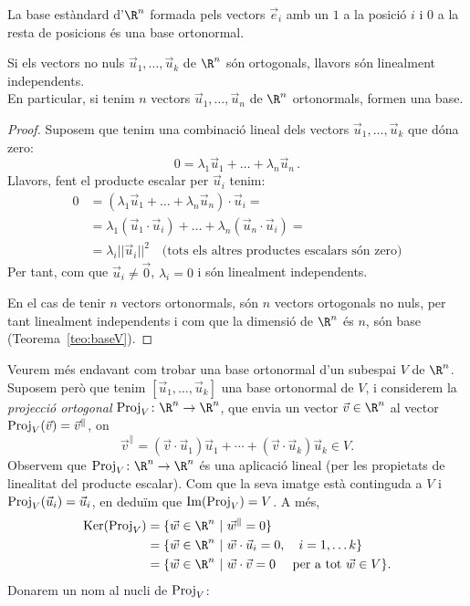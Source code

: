 \begin{exemple}
La base estàndard d'$\R^n$ formada pels vectors $\vec e_i$ amb un $1$ a la posició $i$ i $0$ a la resta de posicions és una base ortonormal.
\end{exemple}
\begin{lema}
Si els vectors no nuls $\vec u_1, \dots, \vec u_k$ de $\R^n$ són ortogonals, llavors són linealment independents.\\
En particular, si tenim $n$ vectors $\vec u_1, \dots, \vec u_n$ de $\R^n$ ortonormals, formen una base.
\end{lema}
\begin{proof}
Suposem que tenim una combinació lineal dels vectors $\vec u_1, \dots, \vec u_k$ que dóna zero:
$$
0 = \lambda_1 \vec u_1 + \dots + \lambda_n\vec u_n \,.
$$
Llavors, fent el producte escalar per $\vec u_i$ tenim:
\begin{align*}
    0 &  = (\lambda_1 \vec u_1 + \dots + \lambda_n\vec u_n)\cdot \vec u_i= \\
     & = \lambda_1 (\vec u_1 \cdot \vec u_i) + \dots + \lambda_n(\vec u_n\cdot \vec u_i)=\\
     & = \lambda_i ||\vec u_i||^2\quad \text{(tots els altres productes escalars són zero)}
\end{align*}
Per tant, com que $\vec u_i\neq\vec 0$, $\lambda_i=0$ i són linealment independents.

En el cas de tenir $n$ vectors ortonormals, són $n$ vectors ortogonals no nuls, per tant linealment independents i com que la dimensió de $\R^n$ és $n$, són base (Teorema~\ref{teo:baseV}).
\end{proof}


Veurem més endavant com trobar una base ortonormal d'un subespai $V$ de $\R^n$. Suposem però que tenim $[\vec u_1,\ldots,\vec u_k]$ una base ortonormal de $V$, i considerem la \emph{projecció ortogonal} $\proj_V\colon \R^n\rightarrow \R^n$, que envia un vector $\vec v\in \R^n$ al vector $\operatorname{Proj}_V(\vec v) = \vec v^\parallel$, on
\[
\vec v^\parallel = (\vec v\cdot \vec u_1)\vec u_1 + \cdots + (\vec v\cdot \vec u_k)\vec u_k \in V.
\]
Observem que $\proj_V\colon \R^n\rightarrow \R^n$ és una aplicació lineal (per les propietats de linealitat del producte escalar). Com que la seva imatge està continguda a $V$ i $\operatorname{Proj}_V(\vec u_i) = \vec u_i$, en deduïm que $\operatorname{Im}(\operatorname{Proj}_V)=V$. A més,
\begin{align*}
\Ker(\proj_V) &= \{\vec w\in\R^n ~|~ \vec w^\parallel = 0\}\\
              &= \{\vec w\in\R^n ~|~ \vec w\cdot \vec u_i = 0, \quad i=1,\ldots k\}\\
              &= \{\vec w\in\R^n ~|~ \vec w\cdot \vec v = 0\quad\text{ per a tot }\vec w \in V\}.
\end{align*}
Donarem un nom al nucli de $\operatorname{Proj}_V$:

